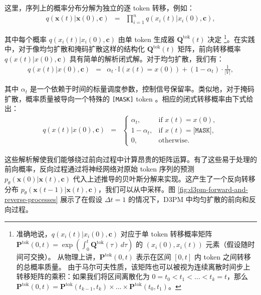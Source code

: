 \noindent 这里，序列上的概率分布分解为独立的逐 token 转移，例如：
\begin{eqnarray}
q(\mathbf{x}(t)|\mathbf{x}(0), \mathbf{c}) & = & \prod_{i=1}^{n} q(x_i(t)|x_i(0), \mathbf{c}),
\end{eqnarray}

\noindent 其中每个概率 $q(x_i(t)|x_i(0), \mathbf{c})$ 由单 token 生成器 $\mathbf{Q}^{\mathrm{tok}}(t)$ 决定
\footnote{准确地说，$q(x_i(t)|x_i(0), \mathbf{c})$ 对应于单 token 转移概率矩阵
$\mathbf{P}^{\mathrm{tok}}(0,t) = \exp\!\left(\int_0^t \mathbf{Q}^{\mathrm{tok}}(\tau)\, d\tau\right)$ 的 $(x_i(0), x_i(t))$ 元素（假设随时间可交换）。
从物理上讲，$\mathbf{P}^{\mathrm{tok}}(0,t)$ 表示在区间 $[0, t]$ 内 token 之间转移的总概率质量。
由于马尔可夫性质，该矩阵也可以被视为连续离散时间步上转移矩阵的乘积：如果我们将区间离散化为 $0=t_0 < t_1 < \dots < t_k=t$，那么
$\mathbf{P}^{\mathrm{tok}}(0,t) = \mathbf{P}^{\mathrm{tok}}(t_{k-1},t_k)\times\dots\times \mathbf{P}^{\mathrm{tok}}(t_0,t_1)$。}。在实践中，对于像均匀扩散和掩码扩散这样的结构化 $\mathbf{Q}^{\mathrm{tok}}(t)$ 矩阵，前向转移概率 $q(x(t) | x(0), \mathbf{c})$ 具有简单的解析闭式解。对于均匀扩散，我们有：
\begin{eqnarray}
q(x(t) | x(0), \mathbf{c}) & = & \alpha_t \cdot \mathbb{I}(x(t) = x(0)) + (1 - \alpha_t) \cdot \frac{1}{|V|},
\end{eqnarray}

\noindent 其中 $\alpha_t$ 是一个依赖于时间的标量调度参数，控制信号保留率。类似地，对于掩码扩散，概率质量被导向一个特殊的 \texttt{[MASK]} token 。相应的闭式转移概率由下式给出：
\begin{eqnarray}
q(x(t) | x(0), \mathbf{c}) & = & \begin{cases} \alpha_t, & \text{if } x(t) = x(0), \\ 1 - \alpha_t, & \text{if } x(t) = \texttt{[MASK]}, \\ 0, & \text{otherwise.} \end{cases}
\end{eqnarray}

这些解析解使我们能够绕过前向过程中计算昂贵的矩阵运算。有了这些易于处理的前向概率，反向过程通过将神经网络对原始 token 序列的预测 $p_\theta(\mathbf{x}(0) | \mathbf{x}(t), \mathbf{c})$ 代入上述推导的贝叶斯分解来实现。这产生了一个反向转移分布 $p_\theta(\mathbf{x}(t - 1) | \mathbf{x}(t), \mathbf{c})$，我们可以从中采样。图 \ref{fig:d3pm-forward-and-reverse-processes} 展示了在假设 $\Delta t = 1$ 的情况下，D3PM 中均匀扩散的前向和反向过程。

